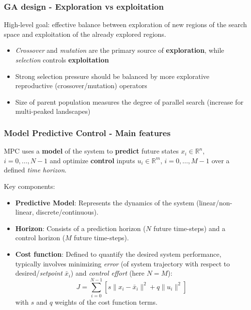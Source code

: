 \documentclass{beamer}
\begin{document}
			\begin{frame}
				\frametitle{GA design - Exploration vs exploitation}
				High-level goal: effective balance between exploration of new regions of the search space and exploitation of the already explored regions.
				
				\vspace{5mm}
				
				\begin{itemize}
					\item \textit{Crossover} and \textit{mutation} are the primary source of \textbf{exploration}, while \textit{selection} controls \textbf{exploitation}
					\item Strong selection pressure should be balanced by more explorative reproductive (crossover/mutation) operators
					\item Size of parent population measures the degree of parallel search (increase for multi-peaked landscapes)
				\end{itemize}
				
			\end{frame}
			
			\begin{frame}
				\frametitle{Model Predictive Control - Main features}
				MPC uses a \textbf{model} of the system to \textbf{predict} future states $x_i \in \mathbb{R}^n$, $i=0,\dots,N-1$ and optimize \textbf{control} inputs $u_i \in \mathbb{R}^m$, $i=0,\dots,M-1$ over a defined \textit{time horizon}.
				
				\vspace{5mm}
				
				Key components:
				\begin{itemize}
				\item \textbf{Predictive Model}: Represents the dynamics of the system (linear/non-linear, discrete/continuous).
				\item \textbf{Horizon}: Consists of a prediction horizon ($N$ future time-steps) and a control horizon ($M$ future time-steps).
				\item \textbf{Cost function}: Defined to quantify the desired system performance, typically involves minimizing \textit{error} (of system trajectory with respect to desired/\textit{setpoint} $\bar{x}_i$) and \textit{control effort} (here $N=M$):
				$$ J = \sum_{i=0}^{N-1}[{s\|x_i - \bar{x}_i\|^2} + q\|u_i\|^2]$$
				with $s$ and $q$ weights of the cost function terms.
				\end{itemize}
		
				
			\end{frame}
			
\end{document}
